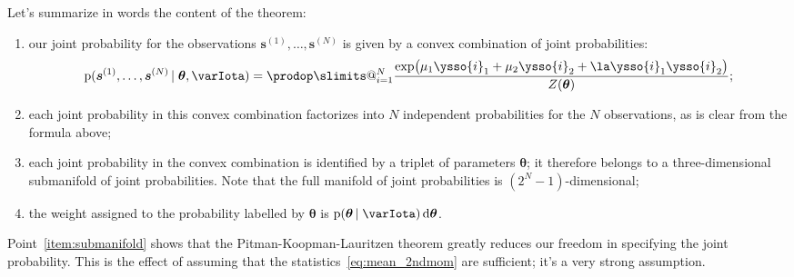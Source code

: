\documentclass[\ifafour a4paper,12pt,\else a5paper,10pt,\fi%
onecolumn,oneside,article,%
british%
]{memoir}
\makeatletter
\theoremstyle{remark}
\theoremstyle{innote}
\def\prod{\DOTSI\prodop\slimits@}
\newcommand*{\di}{\mathrm{d}}%
\newcommand*{\pf}{\mathrm{p}}%
\renewcommand*{\|}{\nonscript\,\vert\nonscript\;\mathopen{}}
\newcommand*{\yI}{\varIota}
\newcommand*{\ys}{\bm{s}}
\newcommand*{\yth}{\bm{\theta}}
\newcommand*{\yso}[1]{\ys^{(#1)}}
\makeatother
\begin{document}
Let's summarize in words the content
of the theorem:
\begin{enumerate}[label=(\textit{\alph*})]
\item our joint probability for the observations $\yso{1}, \dotsc,\yso{N}$
  is given by a convex combination of joint probabilities:
  \begin{equation}
    \label{eq:component_combination}
  \pf(\yso{1}, \dotsc, \yso{N} \|\yth, \yI )
  =
  \prod_{i=1}^{N}
  \frac{  \exp\bigl(
    \mu_1 \ysso{i}_1 + \mu_2 \ysso{i}_2 + \la \ysso{i}_1 \ysso{i}_2
    \bigr) }{Z(\yth)};
  \end{equation}

\item each joint probability in this convex combination factorizes into $N$
  independent probabilities for the $N$ observations, as is clear from the
  formula above;
\item\label{item:submanifold}each joint probability in the convex
  combination is identified by a triplet of parameters $\yth$; it therefore
  belongs to a three-dimensional submanifold of joint probabilities. Note
  that the full manifold of joint probabilities is $(2^N-1)$-dimensional;
\item\label{item:weights}the weight assigned to the probability labelled by
  $\yth$ is $\pf(\yth \|\yI)\,\di\yth$.
\end{enumerate}

Point~\ref{item:submanifold} shows that the Pitman-Koopman-Lauritzen
theorem greatly reduces our freedom in specifying the joint probability.
This is the effect of assuming that the statistics~\eqref{eq:mean_2ndmom}
are sufficient; it's a very strong assumption.
\end{document}
